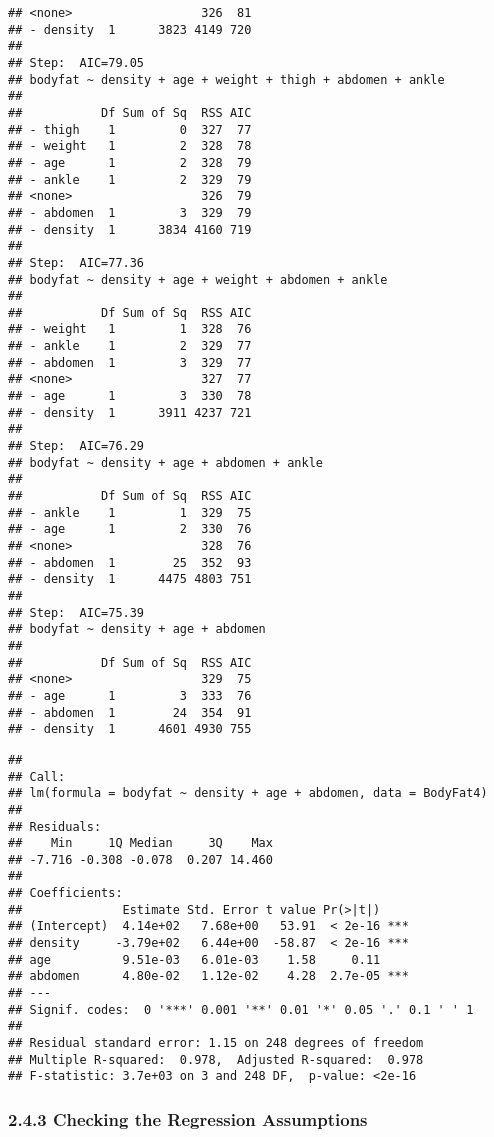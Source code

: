 \documentclass[
]{article}
\begin{document}
\begin{verbatim}
## <none>                  326  81
## - density  1      3823 4149 720
## 
## Step:  AIC=79.05
## bodyfat ~ density + age + weight + thigh + abdomen + ankle
## 
##           Df Sum of Sq  RSS AIC
## - thigh    1         0  327  77
## - weight   1         2  328  78
## - age      1         2  328  79
## - ankle    1         2  329  79
## <none>                  326  79
## - abdomen  1         3  329  79
## - density  1      3834 4160 719
## 
## Step:  AIC=77.36
## bodyfat ~ density + age + weight + abdomen + ankle
## 
##           Df Sum of Sq  RSS AIC
## - weight   1         1  328  76
## - ankle    1         2  329  77
## - abdomen  1         3  329  77
## <none>                  327  77
## - age      1         3  330  78
## - density  1      3911 4237 721
## 
## Step:  AIC=76.29
## bodyfat ~ density + age + abdomen + ankle
## 
##           Df Sum of Sq  RSS AIC
## - ankle    1         1  329  75
## - age      1         2  330  76
## <none>                  328  76
## - abdomen  1        25  352  93
## - density  1      4475 4803 751
## 
## Step:  AIC=75.39
## bodyfat ~ density + age + abdomen
## 
##           Df Sum of Sq  RSS AIC
## <none>                  329  75
## - age      1         3  333  76
## - abdomen  1        24  354  91
## - density  1      4601 4930 755
\end{verbatim}

\begin{verbatim}
## 
## Call:
## lm(formula = bodyfat ~ density + age + abdomen, data = BodyFat4)
## 
## Residuals:
##    Min     1Q Median     3Q    Max 
## -7.716 -0.308 -0.078  0.207 14.460 
## 
## Coefficients:
##              Estimate Std. Error t value Pr(>|t|)    
## (Intercept)  4.14e+02   7.68e+00   53.91  < 2e-16 ***
## density     -3.79e+02   6.44e+00  -58.87  < 2e-16 ***
## age          9.51e-03   6.01e-03    1.58     0.11    
## abdomen      4.80e-02   1.12e-02    4.28  2.7e-05 ***
## ---
## Signif. codes:  0 '***' 0.001 '**' 0.01 '*' 0.05 '.' 0.1 ' ' 1
## 
## Residual standard error: 1.15 on 248 degrees of freedom
## Multiple R-squared:  0.978,  Adjusted R-squared:  0.978 
## F-statistic: 3.7e+03 on 3 and 248 DF,  p-value: <2e-16
\end{verbatim}

\hypertarget{checking-the-regression-assumptions}{%
\subsubsection{\texorpdfstring{\textbf{2.4.3 Checking the Regression
Assumptions}}{2.4.3 Checking the Regression Assumptions}}\label{checking-the-regression-assumptions}}
\end{document}
